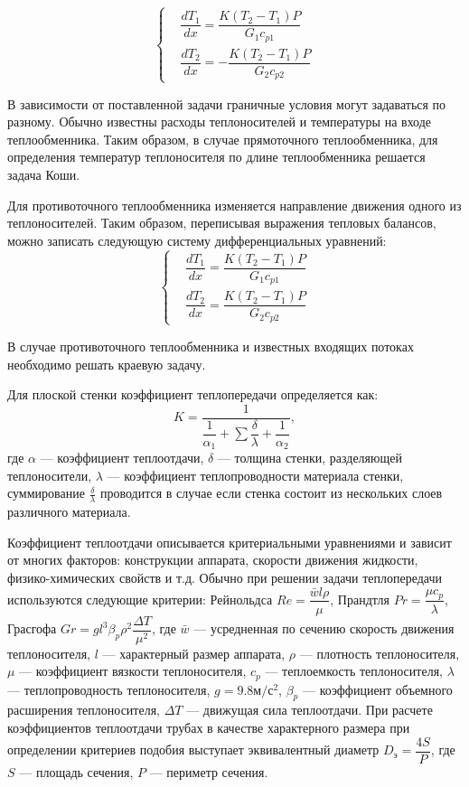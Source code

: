  \begin{equation}
 \left\{
 \begin{aligned}
 &\dfrac{dT_1}{dx}=\dfrac{K(T_2-T_1)P}{G_1 c_{p1}}        \\
 &\dfrac{dT_2}{dx}=-\dfrac{K(T_2-T_1)P}{G_2 c_{p2}}            
 \end{aligned}
 \right.
 \end{equation}

В зависимости от поставленной задачи граничные условия могут задаваться по разному. Обычно известны расходы теплоносителей и температуры на входе теплообменника. Таким образом, в случае прямоточного теплообменника, для определения температур теплоносителя по длине теплообменника решается задача Коши. 

Для противоточного теплообменника изменяется направление движения одного из теплоносителей. Таким образом, переписывая выражения тепловых балансов,  можно записать следующую систему дифференциальных уравнений:
 \begin{equation}
 \left\{
 \begin{aligned}
 &\dfrac{dT_1}{dx}=\dfrac{K(T_2-T_1)P}{G_1 c_{p1}}        \\
 &\dfrac{dT_2}{dx}=\dfrac{K(T_2-T_1)P}{G_2 c_{p2}}            
 \end{aligned}
 \right. 
 \end{equation}
 
В случае противоточного теплообменника и известных входящих потоках необходимо решать краевую задачу.

Для плоской стенки коэффициент теплопередачи определяется как:
\begin{equation}
	K=\dfrac{1}{\dfrac{1}{\alpha_1} + \sum \dfrac{\delta}{\lambda} + \dfrac{1}{\alpha_2}},
\end{equation}
где $\alpha$ --- коэффициент теплоотдачи, $\delta$ --- толщина стенки, разделяющей теплоносители, $\lambda$ --- коэффициент теплопроводности материала стенки, суммирование $\frac{\delta}{\lambda}$ проводится в случае если стенка состоит из нескольких слоев различного материала. 

Коэффициент теплоотдачи описывается критериальными уравнениями и зависит от многих факторов: конструкции аппарата, скорости движения жидкости, физико-химических свойств и т.д. Обычно при решении задачи теплопередачи используются следующие критерии: Рейнольдса $Re=\dfrac{\bar{w} l \rho}{\mu}$, Прандтля $Pr=\dfrac{\mu c_p}{\lambda}$, Грасгофа $ Gr= g l^3 \beta_p \rho^2 \dfrac{\Delta T}{\mu^2}$, где $\bar{w}$ --- усредненная по сечению скорость движения теплоносителя, $l$ --- характерный размер аппарата, $\rho$ --- плотность теплоносителя, $\mu$ --- коэффициент вязкости теплоносителя, $c_p$ --- теплоемкость теплоносителя,  $\lambda$ --- теплопроводность теплоносителя, $g=9.8 м/с^2$, $\beta_p$ --- коэффициент объемного расширения теплоносителя, $\Delta T$ --- движущая сила теплоотдачи. При расчете коэффициентов теплоотдачи трубах в качестве характерного размера при определении критериев подобия выступает эквивалентный диаметр $D_э=\dfrac{4S}{P}$, где $S$ --- площадь сечения, $P$ --- периметр сечения.

